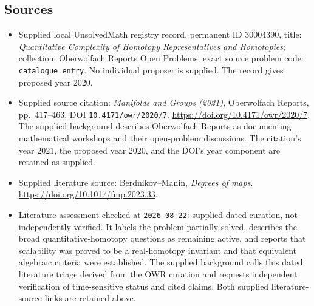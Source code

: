 \documentclass[11pt]{article}
\begin{document}
\subsection{Sources}
\begin{itemize}
\item Supplied local UnsolvedMath registry record, permanent ID \(30004390\), title: \emph{Quantitative Complexity of Homotopy Representatives and Homotopies}; collection: Oberwolfach Reports Open Problems; exact source problem code: \texttt{catalogue entry}. No individual proposer is supplied. The record gives proposed year \(2020\).
\item Supplied source citation: \emph{Manifolds and Groups (2021)}, Oberwolfach Reports, pp.\ 417--463, DOI \texttt{10.4171/owr/2020/7}. \url{https://doi.org/10.4171/owr/2020/7}. The supplied background describes Oberwolfach Reports as documenting mathematical workshops and their open-problem discussions. The citation's year \(2021\), the proposed year \(2020\), and the DOI's year component are retained as supplied.
\item Supplied literature source: Berdnikov--Manin, \emph{Degrees of maps}. \url{https://doi.org/10.1017/fmp.2023.33}.
\item Literature assessment checked at \texttt{2026-08-22}: supplied dated curation, not independently verified. It labels the problem partially solved, describes the broad quantitative-homotopy questions as remaining active, and reports that scalability was proved to be a real-homotopy invariant and that equivalent algebraic criteria were established. The supplied background calls this dated literature triage derived from the OWR curation and requests independent verification of time-sensitive status and cited claims. Both supplied literature-source links are retained above.
\end{itemize}
\end{document}
